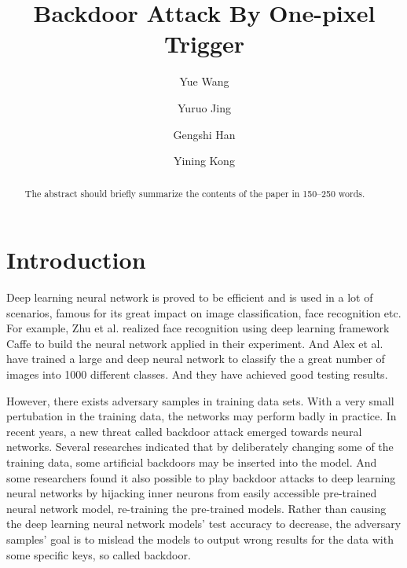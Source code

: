 \documentclass[runningheads]{llncs}
\begin{document}

%
\title{Backdoor Attack By One-pixel Trigger}
%
%
\author{Yue Wang \and
Yuruo Jing \and
Gengshi Han \and
Yining Kong}
%
%
%
\maketitle              %
%
\begin{abstract}
The abstract should briefly summarize the contents of the paper in
150--250 words.

\end{abstract}
%
%
%
\section{Introduction}
Deep learning neural network is proved to be efficient and is used in a lot of scenarios, famous for its great impact on image classification, face recognition etc. For example, Zhu et al. realized face recognition using deep learning framework Caffe to build the neural network applied in their experiment\cite{zhu2018implementation}. And Alex et al. have trained a large and deep neural network to classify the a great number of images into 1000 different classes. And they have achieved good testing results\cite{krizhevsky2012imagenet}.

However, there exists adversary samples in training data sets. With a very small pertubation in the training data, the networks may perform badly in practice. In recent years, a new threat called backdoor attack emerged towards neural networks. Several researches indicated that by deliberately changing some of the training data, some artificial backdoors may be inserted into the model\cite{gu2017badnets}. And some researchers found it also possible to play backdoor attacks to deep learning neural networks by hijacking inner neurons from easily accessible pre-trained neural network model, re-training the pre-trained models\cite{liu2017trojaning}. Rather than causing the deep learning neural network models’ test accuracy to decrease, the adversary samples’ goal is to mislead the models to output wrong results for the data with some specific keys, so called backdoor.
\end{document}
